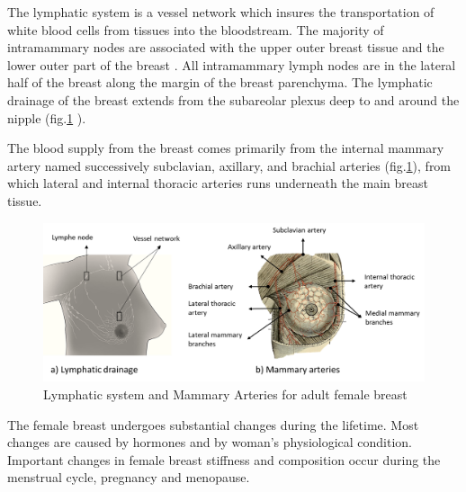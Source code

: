 The lymphatic system is a vessel network which insures the transportation of white blood cells from tissues into the bloodstream. The majority of intramammary nodes are associated with the upper outer breast tissue and the lower outer part of the breast \citep{kopans2007breast}.  All intramammary lymph nodes are in the lateral half of the breast along the margin of the breast parenchyma.  The lymphatic drainage of the breast extends from the subareolar plexus deep to and around the nipple (fig.\ref{fig:lyphaticDrainageandArtery} ).

The blood supply from the breast comes primarily from the internal mammary artery named successively subclavian, axillary, and brachial arteries (fig.\ref{fig:lyphaticDrainageandArtery}), from which lateral and internal thoracic arteries runs underneath the main breast tissue.

	
\begin{figure}[!h]
\centering
\includegraphics[width=\textwidth,keepaspectratio]{figures/lyphaticDrainageandArtery.PNG} 
\caption[Lymphatic system and Mammary Arteries for adult female breast]{Lymphatic system and Mammary Arteries for adult female breast}
\label{fig:lyphaticDrainageandArtery}
\end{figure}






The female breast undergoes substantial changes during the lifetime.  Most changes are caused by hormones and by woman's physiological condition. Important changes in female breast stiffness and composition occur during the menstrual cycle, pregnancy and menopause. 

